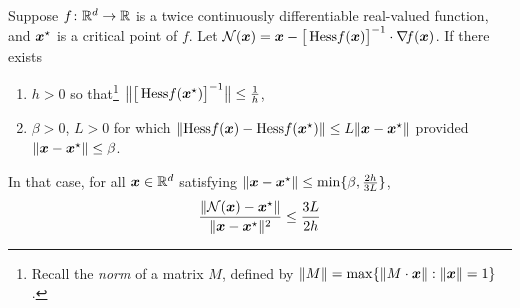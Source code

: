 \begin{theorem}\label{theorem:QuadraticConvergence}
Suppose $f\colon \mathbb{R}^d \to \mathbb{R}$ is a twice continuously differentiable real-valued function, and $\boldsymbol{x}^{\star}$ is a critical point of $f$. Let $\mathcal{N}(\boldsymbol{x}) = \boldsymbol{x} - \big[ \mathop{\mathrm{Hess}{f}}(\boldsymbol{x}) \big]^{-1} \cdot \mathop{\nabla\! {f}}(\boldsymbol{x})$. If there exists 
\begin{enumerate}
	\item $h>0$ so that\footnote{Recall the \emph{norm} of a matrix $M$, defined by $\lVert M \rVert = \max\{ \lVert M\cdot \boldsymbol{x} \rVert : \lVert \boldsymbol{x} \rVert=1 \}$.} $\big\lVert \big[ \mathop{\mathrm{Hess}{f}}(\boldsymbol{x}^{\star})\big]^{-1} \big\rVert \leq \tfrac{1}{h}$,
	\item $\beta>0$, $L>0$ for which $\lVert \mathop{\mathrm{Hess}{f}}(\boldsymbol{x}) - \mathop{\mathrm{Hess}{f}}(\boldsymbol{x}^{\star}) \rVert \leq L \lVert  \boldsymbol{x} - \boldsymbol{x}^{\star}  \rVert$ provided $\lVert  \boldsymbol{x} - \boldsymbol{x}^{\star}  \rVert\leq \beta$.
\end{enumerate}
In that case, for all $\boldsymbol{x} \in \mathbb{R}^d$ satisfying $\lVert  \boldsymbol{x} - \boldsymbol{x}^{\star}  \rVert\leq \min \{\beta, \tfrac{2h}{3L} \}$,
\begin{equation*}
\frac{\lVert  \mathcal{N}(\boldsymbol{x}) - \boldsymbol{x}^{\star}  \rVert}{\lVert \boldsymbol{x} - \boldsymbol{x}^{\star} \rVert^2} \leq \frac{3L}{2h}
\end{equation*}
\end{theorem}